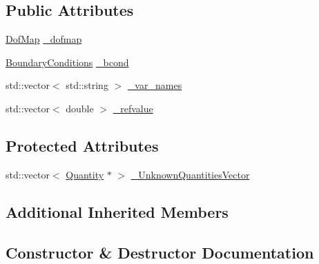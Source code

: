 \subsection*{Public Attributes}
\begin{DoxyCompactItemize}
\item 
\mbox{\hyperlink{classfemus_1_1_dof_map}{Dof\+Map}} \mbox{\hyperlink{classfemus_1_1_system_two_aa496f4dad69f5c1db67755f4dde533ac}{\+\_\+dofmap}}
\item 
\mbox{\hyperlink{classfemus_1_1_boundary_conditions}{Boundary\+Conditions}} \mbox{\hyperlink{classfemus_1_1_system_two_a28c81547e4f056edfc50a3646363db20}{\+\_\+bcond}}
\item 
std\+::vector$<$ std\+::string $>$ \mbox{\hyperlink{classfemus_1_1_system_two_aa5f825192903a5b25cc5039dbfd05037}{\+\_\+var\+\_\+names}}
\item 
std\+::vector$<$ double $>$ \mbox{\hyperlink{classfemus_1_1_system_two_ab5fc565942c844c6ad732ef0de2a9bb7}{\+\_\+refvalue}}
\end{DoxyCompactItemize}
\subsection*{Protected Attributes}
\begin{DoxyCompactItemize}
\item 
std\+::vector$<$ \mbox{\hyperlink{classfemus_1_1_quantity}{Quantity}} $\ast$ $>$ \mbox{\hyperlink{classfemus_1_1_system_two_abe5b49465e4ab69ccb403dcc91c28c04}{\+\_\+\+Unknown\+Quantities\+Vector}}
\end{DoxyCompactItemize}
\subsection*{Additional Inherited Members}


\subsection{Constructor \& Destructor Documentation}
\mbox{\label{classfemus_1_1_system_two_a1b9575a28f58e2c2b1978165258fc754}} 
